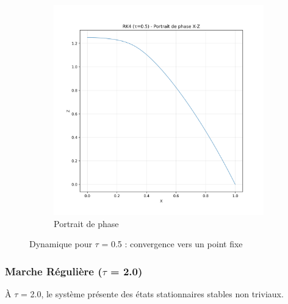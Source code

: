 \begin{figure}[H]
\begin{subfigure}[b]{0.3\textwidth}
        \includegraphics[width=\textwidth]{figures/rk4/rk4_tau0.5_phase}
        \caption{Portrait de phase}
    \end{subfigure}
    \caption{Dynamique pour $\tau$ = 0.5 : convergence vers un point fixe}
    \label{fig:rk4_tau0.5}
\end{figure}

\subsubsection{Marche Régulière ($\tau$ = 2.0)}
À $\tau$ = 2.0, le système présente des états stationnaires stables non triviaux.

